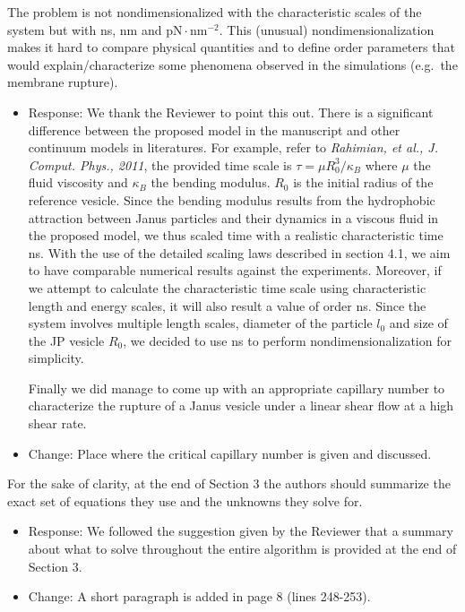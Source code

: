 \documentclass[11pt]{article}
\newcommand{\comment}[1]{{\color{blue} #1}}
\begin{document}
\noindent
\comment{The problem is not nondimensionalized with the characteristic
scales of the system but with ns, nm and $\text{pN} \cdot
\text{nm}^{-2}$. This (unusual) nondimensionalization makes it hard to
compare physical quantities and to define order parameters that would
explain/characterize some phenomena observed in the simulations
(e.g.~the membrane rupture).}

\begin{itemize}
  \item Response: We thank the Reviewer to point this out. There is a significant difference between 
the proposed model in the manuscript and other continuum models in literatures. For example, refer to \emph{Rahimian, et al., J. Comput. Phys., 2011}, the 
provided time scale is $\tau = \mu R_0^3/\kappa_B$ where $\mu$ the fluid viscosity and $\kappa_B$ the bending modulus. $R_0$ is the initial radius of the reference vesicle. Since the bending modulus results from the hydrophobic attraction between Janus particles and their dynamics in a viscous fluid in the proposed model, we thus scaled time with a realistic characteristic time ns. With the use of the detailed scaling laws described in section 4.1, we aim to have comparable
numerical results against the experiments. Moreover, if we attempt to calculate the characteristic 
time scale using characteristic length and energy scales, it will also result a value of order ns. 
Since the system involves multiple length scales, diameter of the particle $l_0$ and size of the JP
vesicle $R_0$, we decided to use ns to perform nondimensionalization for simplicity.

Finally we did manage to come up with an appropriate capillary number to characterize the rupture of a Janus vesicle under a linear shear flow at a high shear rate.

\item Change: Place where the critical capillary number is given and discussed.

\end{itemize}

\noindent
\comment{For the sake of clarity, at the end of Section 3 the authors
should summarize the exact set of equations they use and the unknowns
they solve for.}
\begin{itemize}
  \item Response: We followed the suggestion given by the Reviewer that a summary about what to solve throughout the entire algorithm is provided at the end of Section 3.
  \item Change: A short paragraph is added in page 8 (lines 248-253).
\end{itemize}
\end{document}
